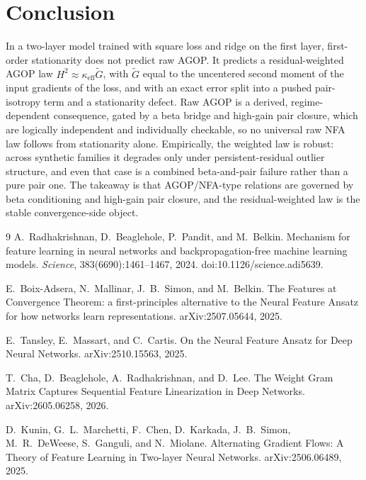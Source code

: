 \documentclass[10pt]{article}
\newcommand{\eff}{\mathrm{eff}}
\newcommand{\Gw}{\widetilde{G}}
\begin{document}
\section{Conclusion}

In a two-layer model trained with square loss and ridge on the first layer, first-order stationarity does not predict raw AGOP. It predicts a residual-weighted AGOP law $H^2 \approx \kappa_{\eff}\Gw$, with $\Gw$ equal to the uncentered second moment of the input gradients of the loss, and with an exact error split into a pushed pair-isotropy term and a stationarity defect. Raw AGOP is a derived, regime-dependent consequence, gated by a beta bridge and high-gain pair closure, which are logically independent and individually checkable, so no universal raw NFA law follows from stationarity alone. Empirically, the weighted law is robust: across synthetic families it degrades only under persistent-residual outlier structure, and even that case is a combined beta-and-pair failure rather than a pure pair one. The takeaway is that AGOP/NFA-type relations are governed by beta conditioning and high-gain pair closure, and the residual-weighted law is the stable convergence-side object.

\begin{thebibliography}{9}\small\setlength{\itemsep}{1pt}
A.~Radhakrishnan, D.~Beaglehole, P.~Pandit, and M.~Belkin.
Mechanism for feature learning in neural networks and backpropagation-free machine learning models.
\emph{Science}, 383(6690):1461--1467, 2024.
doi:10.1126/science.adi5639.

E.~Boix-Adsera, N.~Mallinar, J.~B.~Simon, and M.~Belkin.
The Features at Convergence Theorem: a first-principles alternative to the Neural Feature Ansatz for how networks learn representations.
arXiv:2507.05644, 2025.

E.~Tansley, E.~Massart, and C.~Cartis.
On the Neural Feature Ansatz for Deep Neural Networks.
arXiv:2510.15563, 2025.

T.~Cha, D.~Beaglehole, A.~Radhakrishnan, and D.~Lee.
The Weight Gram Matrix Captures Sequential Feature Linearization in Deep Networks.
arXiv:2605.06258, 2026.

D.~Kunin, G.~L.~Marchetti, F.~Chen, D.~Karkada, J.~B.~Simon, M.~R.~DeWeese, S.~Ganguli, and N.~Miolane.
Alternating Gradient Flows: A Theory of Feature Learning in Two-layer Neural Networks.
arXiv:2506.06489, 2025.
\end{thebibliography}
\end{document}
